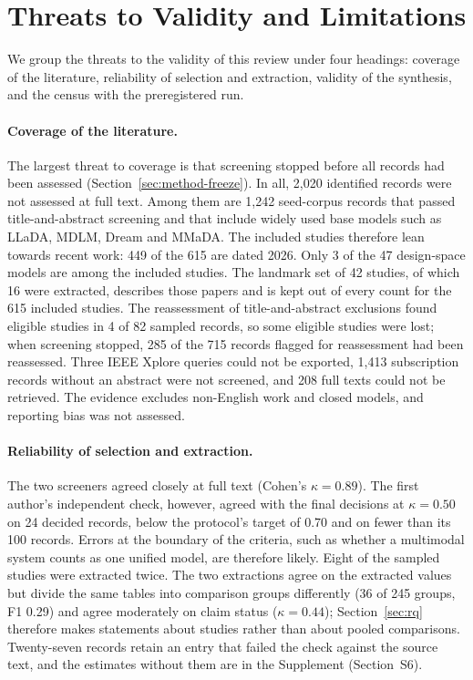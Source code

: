 \section{Threats to Validity and Limitations}
\label{sec:limits}

We group the threats to the validity of this review under four headings: coverage of the literature, reliability of selection and extraction, validity of the synthesis, and the census with the preregistered run.

\paragraph{Coverage of the literature.}
The largest threat to coverage is that screening stopped before all records had been assessed (Section~\ref{sec:method-freeze}). In all, 2,020 identified records were not assessed at full text. Among them are 1,242 seed-corpus records that passed title-and-abstract screening and that include widely used base models such as LLaDA, MDLM, Dream and MMaDA. The included studies therefore lean towards recent work: 449 of the 615 are dated 2026. Only 3 of the 47 design-space models are among the included studies. The landmark set of 42 studies, of which 16 were extracted, describes those papers and is kept out of every count for the 615 included studies. The reassessment of title-and-abstract exclusions found eligible studies in 4 of 82 sampled records, so some eligible studies were lost; when screening stopped, 285 of the 715 records flagged for reassessment had been reassessed. Three IEEE Xplore queries could not be exported, 1,413 subscription records without an abstract were not screened, and 208 full texts could not be retrieved. The evidence excludes non-English work and closed models, and reporting bias was not assessed.

\paragraph{Reliability of selection and extraction.}
The two screeners agreed closely at full text (Cohen's $\kappa=0.89$). The first author's independent check, however, agreed with the final decisions at $\kappa=0.50$ on 24 decided records, below the protocol's target of 0.70 and on fewer than its 100 records. Errors at the boundary of the criteria, such as whether a multimodal system counts as one unified model, are therefore likely. Eight of the sampled studies were extracted twice. The two extractions agree on the extracted values but divide the same tables into comparison groups differently (36 of 245 groups, F1 0.29) and agree moderately on claim status ($\kappa=0.44$); Section~\ref{sec:rq} therefore makes statements about studies rather than about pooled comparisons. Twenty-seven records retain an entry that failed the check against the source text, and the estimates without them are in the Supplement (Section~S6).


